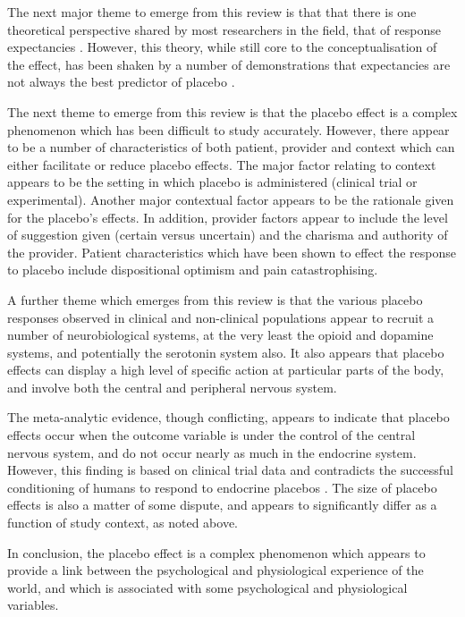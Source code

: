 The next major theme to emerge from this review is that that there is one theoretical perspective shared by most researchers in the field, that of response expectancies \cite{Kirsch1997,Kirsch1985}. However, this theory, while still core to the conceptualisation of the effect, has been shaken by a number of demonstrations that expectancies are not always the best predictor of placebo \cite{Hyland2006,Geers2005a}.

The next theme to emerge from this review is that the placebo effect is a complex phenomenon which has been difficult to study accurately. However, there appear to be a number of characteristics of both patient, provider and context which can either  facilitate or reduce placebo effects.  The major factor relating to context appears to be the setting in which placebo is administered (clinical trial or experimental). Another major contextual factor appears to be the rationale given for the placebo's effects.  In addition, provider factors appear to include the level of suggestion given (certain versus uncertain) and the charisma and authority of the provider. Patient characteristics which have been shown to effect the response to placebo include dispositional optimism and pain catastrophising. 

A further theme which emerges from this review is that the various placebo responses observed in clinical and non-clinical populations appear to recruit a number of neurobiological systems, at the very least the opioid and dopamine systems, and potentially the serotonin system also. It also appears that placebo effects can display a high level of specific action at particular parts of the body, and involve both the central and peripheral nervous system. 

The meta-analytic evidence, though conflicting, appears to indicate that placebo effects occur when the outcome variable is under the control of the central nervous system, and do not occur nearly as much in the endocrine system. However, this finding is based on clinical trial data and contradicts the successful conditioning of humans to respond to endocrine placebos \cite{Benedetti2003a}. The size of placebo effects is also a matter of some dispute, and appears to significantly differ as a function of study context, as noted above. 

In conclusion, the placebo effect is a complex phenomenon which appears to provide a link between the psychological and physiological  experience of the world, and which is associated  with some psychological and physiological variables. 


